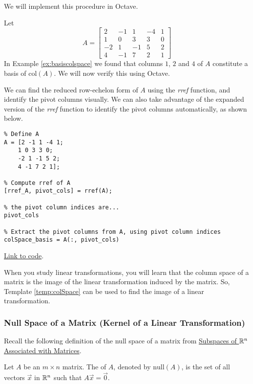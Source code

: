 \documentclass{ximera}
\begin{document}
We will implement this procedure in Octave.

\begin{template}\label{temp:colSpace}
Let $$A=\begin{bmatrix}2&-1&1&-4&1\\1&0&3&3&0\\-2&1&-1&5&2\\4&-1&7&2&1\end{bmatrix}$$
In Example \ref{ex:basiscolspace} we found that columns $1$, $2$ and $4$ of $A$ constitute a basis of $\text{col}(A)$.  We will now verify this using Octave.

We can find the reduced row-echelon form of $A$ using the \emph{rref} function, and identify the pivot columns visually.  We can also take advantage of the expanded version of the \emph{rref} function to identify the pivot columns automatically, as shown below.

\begin{verbatim}
% Define A
A = [2 -1 1 -4 1;
    1 0 3 3 0;
    -2 1 -1 5 2;
    4 -1 7 2 1];

% Compute rref of A
[rref_A, pivot_cols] = rref(A);

% the pivot column indices are...
pivot_cols

% Extract the pivot columns from A, using pivot column indices
colSpace_basis = A(:, pivot_cols)
\end{verbatim}

\href{https://sagecell.sagemath.org/?z=eJxtTkEKwjAQvAfyh7kULNhiqiIoHoL6Ao9SSq2JBmxTklR8vhssKOjuZWeGmdkEe6VNpyA5k9jiVCATEMgWEBvOQCMww5x2NuKsiLrAEsXILCJcgfiSGM4S7GzbD0HBOaVhdUw_xbuSU_TmYUPV2LsvqTCyE5mOvnBTbx2kD20H011Mozxqp_I85-xjfhsOz-DqJvwYPbSzLahu8Ka7_g3ljPCxrxtVnWtvPH0jJ-vvB9MX3FlRVA==&lang=octave&interacts=eJyLjgUAARUAuQ==}{Link to code}.

\end{template}  

When you study linear transformations, you will learn that the column space of a matrix is the image of the linear transformation induced by the matrix.  So, Template \ref{temp:colSpace} can be used to find the image of a linear transformation.

\subsubsection*{Null Space of a Matrix (Kernel of a Linear Transformation)}

Recall the following definition of the null space of a matrix from \href{https://ximera.osu.edu/linearalgebradzv3/LinearAlgebraInteractiveIntro/VSP-0040/main}{Subspaces of $\mathbb{R}^n$ Associated with Matrices}.
\begin{definition}[\ref{def:nullspace}] Let $A$ be an $m\times n$ matrix.  The  of $A$, denoted by $\mbox{null}(A)$, is the set of all vectors $\vec{x}$ in $\mathbb{R}^n$ such that $A\vec{x}=\vec{0}$.
\end{definition}
\end{document}
